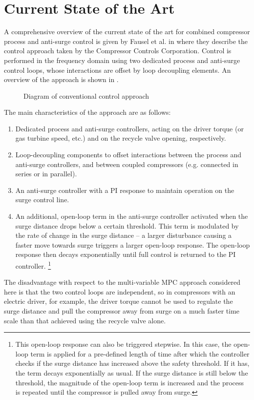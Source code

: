 \section{Current State of the Art}
\label{sec:lit:sota}

A comprehensive overview of the current state of the art for combined compressor process and anti-surge control is given by Fausel et al. in \cite{Fausel2010} where they describe the control approach taken by the Compressor Controls Corporation.
Control is performed in the frequency domain using two dedicated process and anti-surge control loops, whose interactions are offset by loop decoupling elements.
An overview of the approach is shown in .

\begin{figure}
  Diagram of conventional control approach
  \caption{}
  \label{fig:lit:sota-diagram}
\end{figure}

The main characteristics of the approach are as follows:

\begin{enumerate}
  \item Dedicated process and anti-surge controllers, acting on the driver torque (or gas turbine speed, etc.) and on the recycle valve opening, respectively.
  \item Loop-decoupling components to offset interactions between the process and anti-surge controllers, and between coupled compressors (e.g. connected in series or in parallel).
  \item An anti-surge controller with a PI response to maintain operation on the surge control line.
  \item An additional, open-loop term in the anti-surge controller activated when the surge distance drops below a certain threshold. 
    This term is modulated by the rate of change in the surge distance -- a larger disturbance causing a faster move towards surge triggers a larger open-loop response. 
    The open-loop response then decays exponentially until full control is returned to the PI controller.
    \footnote{This open-loop response can also be triggered stepwise. 
      In this case, the open-loop term is applied for a pre-defined length of time after which the controller checks if the surge distance has increased above the safety threshold. 
      If it has, the term decays exponentially as usual. 
    If the surge distance is still below the threshold, the magnitude of the open-loop term is increased and the process is repeated until the compressor is pulled away from surge.}
\end{enumerate}

The disadvantage with respect to the multi-variable MPC approach considered here is that the two control loops are independent, so in compressors with an electric driver, for example, the driver torque cannot be used to regulate the surge distance and pull the compressor away from surge on a much faster time scale than that achieved using the recycle valve alone.

